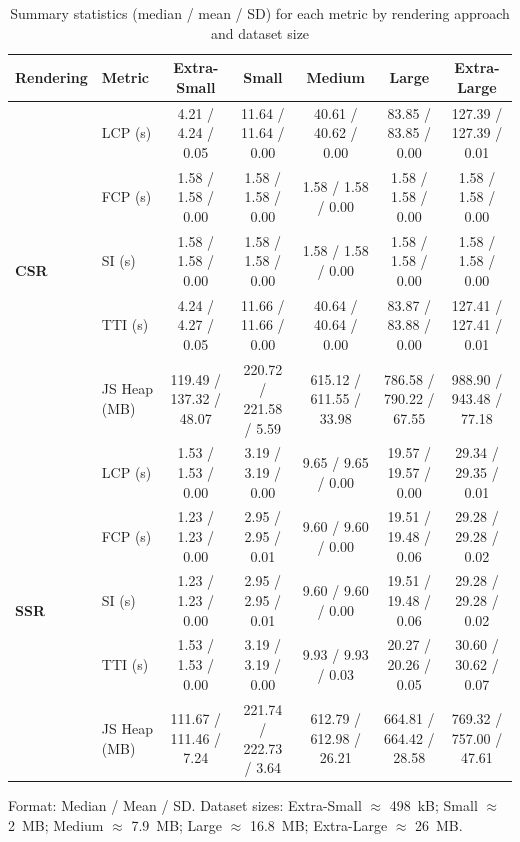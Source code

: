 \begin{table}[!t]
\centering
\footnotesize
\caption{Summary statistics (median / mean / SD) for each metric by rendering approach and dataset size}
\label{tab:analyzed_metrics}
\begin{tabular}{|l|l|c|c|c|c|c|}
\hline
\textbf{Rendering} & \textbf{Metric} & \textbf{Extra-Small} & \textbf{Small} & \textbf{Medium} & \textbf{Large} & \textbf{Extra-Large} \\
\hline
\multirow{5}{*}{\textbf{CSR}}
  & LCP (s)       & 4.21 / 4.24 / 0.05   & 11.64 / 11.64 / 0.00 & 40.61 / 40.62 / 0.00 & 83.85 / 83.85 / 0.00  & 127.39 / 127.39 / 0.01 \\ \cline{2-7}
  & FCP (s)       & 1.58 / 1.58 / 0.00   &  1.58 /  1.58 / 0.00 &  1.58 /  1.58 / 0.00 &  1.58 /  1.58 / 0.00  &   1.58 /   1.58 / 0.00 \\ \cline{2-7}
  & SI (s)        & 1.58 / 1.58 / 0.00   &  1.58 /  1.58 / 0.00 &  1.58 /  1.58 / 0.00 &  1.58 /  1.58 / 0.00  &   1.58 /   1.58 / 0.00 \\ \cline{2-7}
  & TTI (s)       & 4.24 / 4.27 / 0.05   & 11.66 / 11.66 / 0.00 & 40.64 / 40.64 / 0.00 & 83.87 / 83.88 / 0.00  & 127.41 / 127.41 / 0.01 \\ \cline{2-7}
  & JS Heap (MB)  & 119.49 / 137.32 / 48.07 & 220.72 / 221.58 / 5.59 & 615.12 / 611.55 / 33.98 & 786.58 / 790.22 / 67.55 & 988.90 / 943.48 / 77.18 \\
\hline
\multirow{5}{*}{\textbf{SSR}}
  & LCP (s)       & 1.53 / 1.53 / 0.00   &  3.19 /  3.19 / 0.00 &  9.65 /  9.65 / 0.00 & 19.57 / 19.57 / 0.00  &  29.34 /  29.35 / 0.01 \\ \cline{2-7}
  & FCP (s)       & 1.23 / 1.23 / 0.00   &  2.95 /  2.95 / 0.01 &  9.60 /  9.60 / 0.00 & 19.51 / 19.48 / 0.06  &  29.28 /  29.28 / 0.02 \\ \cline{2-7}
  & SI (s)        & 1.23 / 1.23 / 0.00   &  2.95 /  2.95 / 0.01 &  9.60 /  9.60 / 0.00 & 19.51 / 19.48 / 0.06  &  29.28 /  29.28 / 0.02 \\ \cline{2-7}
  & TTI (s)       & 1.53 / 1.53 / 0.00   &  3.19 /  3.19 / 0.00 &  9.93 /  9.93 / 0.03 & 20.27 / 20.26 / 0.05  &  30.60 /  30.62 / 0.07 \\ \cline{2-7}
  & JS Heap (MB)  & 111.67 / 111.46 / 7.24 & 221.74 / 222.73 / 3.64 & 612.79 / 612.98 / 26.21 & 664.81 / 664.42 / 28.58 & 769.32 / 757.00 / 47.61 \\
\hline
\end{tabular}
\vspace{2pt}
\begin{flushleft}
\footnotesize
Format: Median / Mean / SD. Dataset sizes: Extra-Small $\approx$ 498~kB; Small $\approx$ 2~MB; Medium $\approx$ 7.9~MB; Large $\approx$ 16.8~MB; Extra-Large $\approx$ 26~MB.
\end{flushleft}
\end{table}
